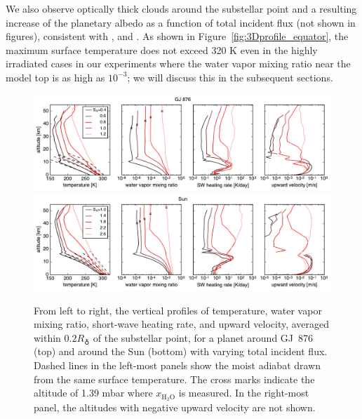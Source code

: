 \documentclass[11pt,numberedappendix,twocolappendix,]{emulateapj}
\def\water{H$_2$O}
\def\xwater{$x_\text{\water}$}
\def\preslevel{1.39 mbar}
\def\wv{water vapor}
\begin{document}
We also observe optically thick clouds around the substellar point and a resulting increase of the planetary albedo as a function of total incident flux (not shown in figures), consistent with \citet{Yang2013,Yang2014}, \citet{Kopparapu2016} and \citet{Way2016}. 
As shown in Figure~\ref{fig:3Dprofile_equator}, the maximum surface temperature does not exceed 320 K even in the highly irradiated cases in our experiments where the \wv{} mixing ratio near the model top is as high as $10^{-3}$; we will discuss this in the subsequent sections. 

\begin{figure}[t]
    \begin{center}
    \includegraphics[width=1\hsize]{AqOH0TLS_GJ876_temp_xH2O_vz_heat_ver2.pdf}
    \includegraphics[width=1\hsize]{AqOH0TLS_Sun_temp_xH2O_vz_heat_ver2.pdf}
    \end{center}
\caption{From left to right, the vertical profiles of temperature, \wv{} mixing ratio, short-wave heating rate, and upward velocity, averaged within $0.2R_\earth$ of the substellar point, for a planet around GJ~876 (top) and around the Sun (bottom) with varying total incident flux. Dashed lines in the left-most panels show the moist adiabat drawn from the same surface temperature. The cross marks indicate the altitude of \preslevel{} where \xwater{} is measured. In the right-most panel, the altitudes with negative upward velocity are not shown. }
\label{fig:AqOH0TLS_GJ876_temp_xH2O_vz_heat}
\end{figure}


\end{document}
